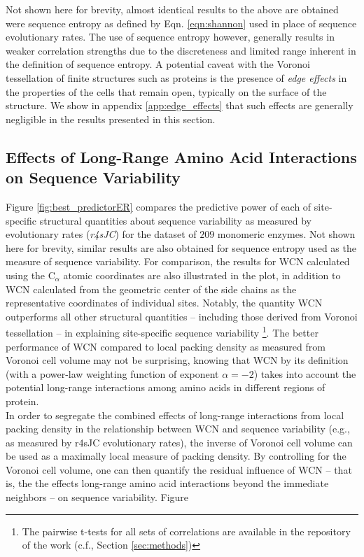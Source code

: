 \documentclass[11pt]{article}
\begin{document}
    Not shown here for brevity, almost identical results to the above are obtained were sequence entropy as defined by Eqn. \ref{eqn:shannon} used in place of sequence evolutionary rates. The use of sequence entropy however, generally results in weaker correlation strengths due to the discreteness and limited range inherent in the definition of sequence entropy. A potential caveat with the Voronoi tessellation of finite structures such as proteins is the presence of {\it edge effects} in the properties of the cells that remain open, typically on the surface of the structure. We show in appendix \ref{app:edge_effects} that such effects are generally negligible in the results presented in this section. \\

    \subsection*{Effects of Long-Range Amino Acid Interactions on Sequence Variability}

    Figure \ref{fig:best_predictorER} compares the predictive power of each of site-specific structural quantities about sequence variability as measured by evolutionary rates ({\it r4sJC}) for the dataset of $209$ monomeric enzymes. Not shown here for brevity, similar results are also obtained for sequence entropy used as the measure of sequence variability. For comparison, the results for WCN calculated using the C$_\alpha$ atomic coordinates are also illustrated in the plot, in addition to WCN calculated from the geometric center of the side chains as the representative coordinates of individual sites. Notably, the quantity WCN outperforms all other structural quantities -- including those derived from Voronoi tessellation -- in explaining site-specific sequence variability \footnote{The pairwise t-tests for all sets of correlations are available in the repository of the work (c.f., Section \ref{sec:methods})}. The better performance of WCN compared to local packing density as measured from Voronoi cell volume may not be surprising, knowing that WCN by its definition (with a power-law weighting function of exponent $\alpha=-2$) takes into account the potential long-range interactions among amino acids in different regions of protein. \\

    In order to segregate the combined effects of long-range interactions from local packing density in the relationship between WCN and sequence variability (e.g., as measured by r4sJC evolutionary rates), the inverse of Voronoi cell volume can be used as a maximally local measure of packing density. By controlling for the Voronoi cell volume, one can then quantify the residual influence of WCN -- that is, the the effects long-range amino acid interactions beyond the immediate neighbors -- on sequence variability. Figure
\end{document}
